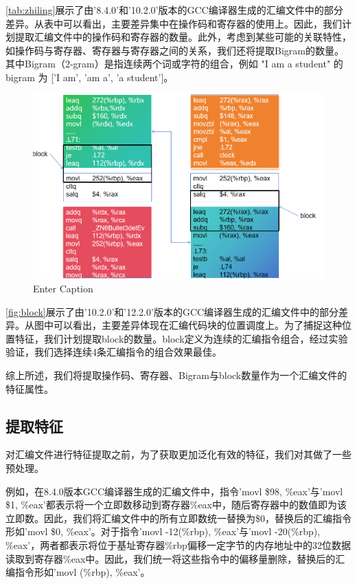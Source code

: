 \autoref{tab:zhiling}展示了由'8.4.0'和'10.2.0'版本的GCC编译器生成的汇编文件中的部分差异。从表中可以看出，主要差异集中在操作码和寄存器的使用上。因此，我们计划提取汇编文件中的操作码和寄存器的数量。此外，考虑到某些可能的关联特性，如操作码与寄存器、寄存器与寄存器之间的关系，我们还将提取Bigram的数量。其中Bigram（2-gram）是指连续两个词或字符的组合，例如 "I am a student" 的 bigram 为 ['I am', 'am a', 'a student']。
\begin{figure}
    \centering
    \includegraphics[width=1\linewidth]{figures/block.png}
    \caption{Enter Caption}
    \label{fig:block}
\end{figure}


  \autoref{fig:block}展示了由'10.2.0'和'12.2.0'版本的GCC编译器生成的汇编文件中的部分差异。从图中可以看出，主要差异体现在汇编代码块的位置调度上。为了捕捉这种位置特征，我们计划提取block的数量。block定义为连续的汇编指令组合，经过实验验证，我们选择连续4条汇编指令的组合效果最佳。

  综上所述，我们将提取操作码、寄存器、Bigram与block数量作为一个汇编文件的特征属性。

  \subsection{提取特征}
  对汇编文件进行特征提取之前，为了获取更加泛化有效的特征，我们对其做了一些预处理。
  
  例如，在8.4.0版本GCC编译器生成的汇编文件中，指令'movl \$98, \%eax'与'movl \$1, \%eax'都表示将一个立即数移动到寄存器\%eax中，随后寄存器中的数值即为该立即数。因此，我们将汇编文件中的所有立即数统一替换为\$0，替换后的汇编指令形如'movl \$0, \%eax'。对于指令'movl -12(\%rbp), \%eax'与'movl -20(\%rbp), \%eax'，两者都表示将位于基址寄存器\%rbp偏移一定字节的内存地址中的32位数据读取到寄存器\%eax中。因此，我们统一将这些指令中的偏移量删除，替换后的汇编指令形如'movl (\%rbp), \%eax'。

